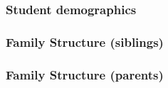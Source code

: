 \documentclass{beamer}
\begin{document}
\begin{frame}
    \label{update_scott}
    \frametitle{Student demographics}
 {
    }
\end{frame}

\begin{frame}
    \label{update_scott}
    \frametitle{Family Structure (siblings)}
 {
    }
\end{frame}

\begin{frame}
    \label{update_scott}
    \frametitle{Family Structure (parents)}
 {
    }
\end{frame}
\end{document}
